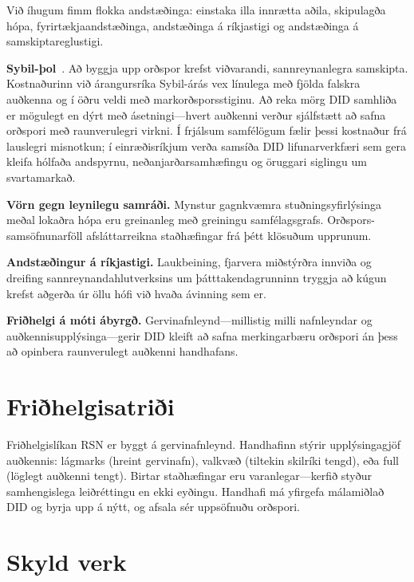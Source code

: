 \documentclass[11pt,a4paper,twocolumn]{article}
\begin{document}
Við íhugum fimm flokka andstæðinga: einstaka illa innrætta aðila, skipulagða hópa, fyrirtækjaandstæðinga, andstæðinga á ríkjastigi og andstæðinga á samskiptareglustigi.

\textbf{Sybil-þol}~\cite{douceur2002}. Að byggja upp orðspor krefst viðvarandi, sannreynanlegra samskipta. Kostnaðurinn við árangursríka Sybil-árás vex línulega með fjölda falskra auðkenna og í öðru veldi með markorðsporsstiginu. Að reka mörg DID samhliða er mögulegt en dýrt með ásetningi---hvert auðkenni verður sjálfstætt að safna orðspori með raunverulegri virkni. Í frjálsum samfélögum fælir þessi kostnaður frá lauslegri misnotkun; í einræðisríkjum verða samsíða DID lifunarverkfæri sem gera kleifa hólfaða andspyrnu, neðanjarðarsamhæfingu og öruggari siglingu um svartamarkað.

\textbf{Vörn gegn leynilegu samráði.} Mynstur gagnkvæmra stuðningsyfirlýsinga meðal lokaðra hópa eru greinanleg með greiningu samfélagsgrafs. Orðspors-samsöfnunarföll afsláttarreikna staðhæfingar frá þétt klösuðum upprunum.

\textbf{Andstæðingur á ríkjastigi.} Laukbeining, fjarvera miðstýrðra innviða og dreifing sannreynandahlutverksins um þátttakendagrunninn tryggja að kúgun krefst aðgerða úr öllu hófi við hvaða ávinning sem er.

\textbf{Friðhelgi á móti ábyrgð.} Gervinafnleynd---millistig milli nafnleyndar og auðkennisupplýsinga---gerir DID kleift að safna merkingarbæru orðspori án þess að opinbera raunverulegt auðkenni handhafans.

\section{Friðhelgisatriði}

Friðhelgislíkan RSN er byggt á gervinafnleynd. Handhafinn stýrir upplýsingagjöf auðkennis: lágmarks (hreint gervinafn), valkvæð (tiltekin skilríki tengd), eða full (löglegt auðkenni tengt). Birtar staðhæfingar eru varanlegar---kerfið styður samhengislega leiðréttingu en ekki eyðingu. Handhafi má yfirgefa málamiðlað DID og byrja upp á nýtt, og afsala sér uppsöfnuðu orðspori.

\section{Skyld verk}
\end{document}
